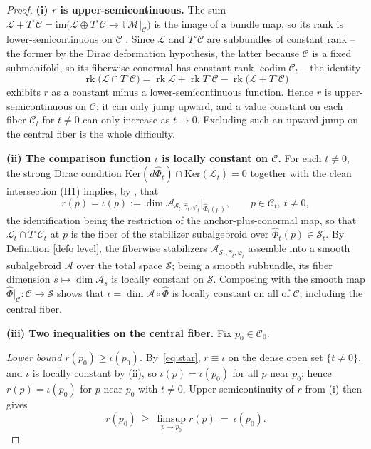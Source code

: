 \documentclass[reqno]{amsart}
\theoremstyle{plain}
\theoremstyle{definition}
\newcommand{\rk}{\operatorname{rk}}
\newcommand{\C}{\mathcal{C}}
\renewcommand{\S}{\mathcal{S}}
\newcommand{\M}{\mathcal{M}}
\renewcommand{\L}{\mathcal{L}}
\newcommand{\Phib}{\widehat{\Phi}}
\newcommand{\gammab}{\widehat{\gamma}}
\newcommand{\A}{\mathcal{A}}
\newcommand{\Ker}{\text{Ker}}
\begin{document}
\begin{proof}
\medskip

\noindent\textbf{(i) $r$ is upper-semicontinuous.}
The sum $\L+T^{\circ}\C=\mathrm{im}\big(\L\oplus T^{\circ}\C\to\mathbb{T}\M|_\C\big)$ is the image
of a bundle map, so its rank is lower-semicontinuous on $\C$
\cite[Section 1.1]{bursztyn2013brief}. Since $\L$ and $T^{\circ}\C$ are subbundles of constant rank
-- the former by the Dirac deformation hypothesis, the latter because $\C$ is a fixed submanifold, so its fiberwise conormal has constant rank $\operatorname{codim}
\C_t$ -- the identity
\[
  \rk\big(\L\cap T^{\circ}\C\big)
   =\rk \L+\rk T^{\circ}\C-\rk\big(\L+T^{\circ}\C\big)
\]
exhibits $r$ as a constant minus a lower-semicontinuous function. Hence $r$ is upper-semicontinuous on $\C$: it can only jump upward, and a value constant on each
fiber $\C_t$ for $t\neq0$ can only increase as $t\to 0$. Excluding such an upward jump on the central fiber is the whole difficulty.
 
\medskip
\noindent\textbf{(ii) The comparison function $\iota$ is locally constant on $\C$.}
For each $t\neq 0$, the strong Dirac condition
$\Ker(d\Phib_t)\cap \Ker(\L_t)=0$ together with the clean intersection (H1) implies, by \cite[Proposition 2.17]{bualibanu2026reduction}, that
\begin{equation}\label{eq:star}
  r(p)=\iota(p):=\dim\A_{\S_t,\gammab_t,\varphi_t}\big|_{\Phib_t(p)},
  \qquad p\in \C_t,\ t\neq 0,
\end{equation}
the identification being the restriction of the anchor-plus-conormal map, so that
$\L_t\cap T^{\circ}\C_t$ at $p$ is the fiber of the stabilizer subalgebroid over $\Phib_t(p)\in \S_t$. By Definition \ref{defo level}, the fiberwise stabilizers $\A_{\S_t,\gammab_t,\varphi_t}$ assemble into a smooth subalgebroid $\A$ over the
total space $\S$; being a smooth subbundle, its fiber dimension $s\mapsto \dim\A_s$ is locally constant on $\S$. Composing with the smooth map $\Phib|_\C : \C\to \S$ shows
that $\iota=\dim\A\circ\Phib$ is locally constant on all of $\C$, including the central fiber.
 
\medskip
\noindent\textbf{(iii) Two inequalities on the central fiber.}
Fix $p_0\in \C_0$.
 
\emph{Lower bound $r(p_0)\ge\iota(p_0)$.} By~\eqref{eq:star}, $r\equiv\iota$ on the dense open set $\{t\neq0\}$, and $\iota$ is locally constant by (ii), so
$\iota(p)=\iota(p_0)$ for all $p$ near $p_0$; hence $r(p)=\iota(p_0)$ for $p$ near
$p_0$ with $t\neq0$. Upper-semicontinuity of $r$ from (i) then gives
\[
  r(p_0)\ \ge\ \limsup_{p\to p_0} r(p)\ =\ \iota(p_0).
\]
 

\end{proof}
\end{document}

